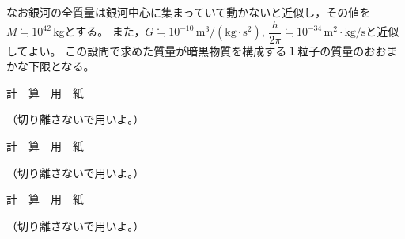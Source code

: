 \documentclass[b5paper, papersize, fleqn, 11pt, dvipdfmx, bold, nodots]{jsarticle}
\begin{document}
\begin{enumerate}[label=\Roman*]
\begin{enumerate}[label=\Kakko*]
    なお銀河の全質量は銀河中心に集まっていて動かないと近似し，その値を$M\fallingdotseq10^{42}$\,kgとする。
    また，$G\fallingdotseq10^{-10}\,\mathrm{m^3/(kg\cdot s^2)}$, $\dfrac{h}{2\pi}\fallingdotseq10^{-34}\,\mathrm{m^2\cdot kg/s}$と近似してよい。
    この設問で求めた質量が暗黒物質を構成する１粒子の質量のおおまかな下限となる。
  \end{enumerate}
\end{enumerate}

\newpage

\begin{center}
  {\large 計　算　用　紙}\par
  （切り離さないで用いよ。）
\end{center}

\newpage

\begin{center}
  {\large 計　算　用　紙}\par
  （切り離さないで用いよ。）
\end{center}

\newpage

\begin{center}
  {\large 計　算　用　紙}\par
  （切り離さないで用いよ。）
\end{center}

\newpage
\end{document}
